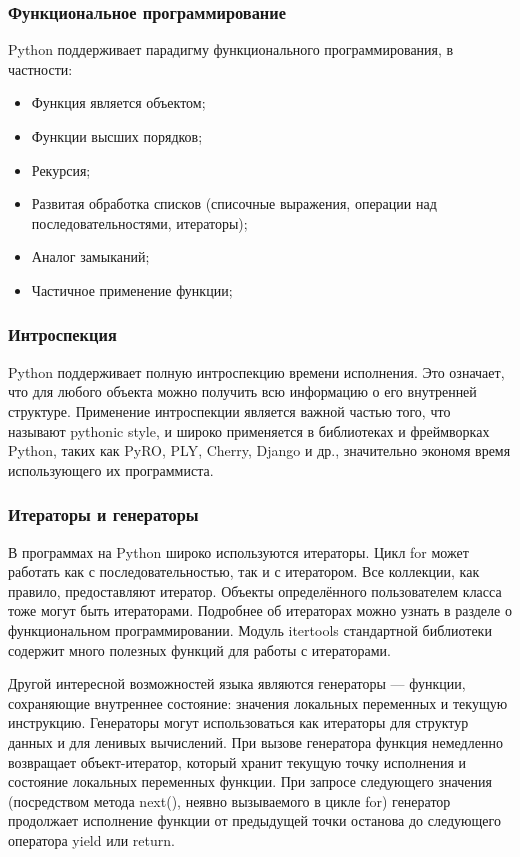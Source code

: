 \subsubsection{Функциональное программирование}
Python поддерживает парадигму функционального программирования, в частности:
\begin{itemize}
\item Функция является объектом;
\item Функции высших порядков;
\item Рекурсия;
\item Развитая обработка списков (списочные выражения, операции над последовательностями, итераторы);
\item Аналог замыканий;
\item Частичное применение функции;
\end{itemize}

\subsubsection{Интроспекция}
Python поддерживает полную интроспекцию времени исполнения. Это означает, что для любого объекта можно получить всю информацию о его внутренней структуре.
Применение интроспекции является важной частью того, что называют pythonic style, и широко применяется в библиотеках и фреймворках Python, таких как PyRO, PLY, Cherry, Django и др., значительно экономя время использующего их программиста.

\subsubsection{Итераторы и генераторы}
В программах на Python широко используются итераторы. Цикл for может работать как с последовательностью, так и с итератором. Все коллекции, как правило, предоставляют итератор. Объекты определённого пользователем класса тоже могут быть итераторами. Подробнее об итераторах можно узнать в разделе о функциональном программировании. Модуль itertools стандартной библиотеки содержит много полезных функций для работы с итераторами.

Другой интересной возможностей языка являются генераторы — функции, сохраняющие внутреннее состояние: значения локальных переменных и текущую инструкцию. Генераторы могут использоваться как итераторы для структур данных и для ленивых вычислений.
При вызове генератора функция немедленно возвращает объект-итератор, который хранит текущую точку исполнения и состояние локальных переменных функции. При запросе следующего значения (посредством метода next(), неявно вызываемого в цикле for) генератор продолжает исполнение функции от предыдущей точки останова до следующего оператора yield или return.


